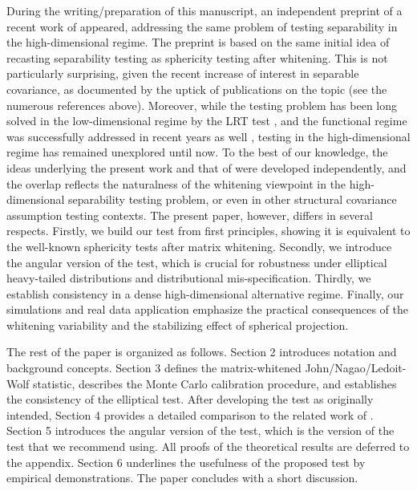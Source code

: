 \documentclass[12pt]{article}
\begin{document}
During the writing/preparation of this manuscript, an independent preprint of a recent work of \citet{sung2026testing} appeared, addressing the same problem of testing separability in the high-dimensional regime. The preprint is based on the same initial idea of recasting separability testing as sphericity testing after whitening. This is not particularly surprising, given the recent increase of interest in separable covariance, as documented by the uptick of publications on the topic (see the numerous references above). Moreover, while the testing problem has been long solved in the low-dimensional regime by the LRT test \citep{lu2005likelihood,MITCHELL2006}, and the functional regime was successfully addressed in recent years as well \citep{aston2017tests, dette2025testing}, testing in the high-dimensional regime has remained unexplored until now. To the best of our knowledge, the ideas underlying the present work and that of \citet{sung2026testing} were developed independently, and the overlap reflects the naturalness of the whitening viewpoint in the high-dimensional separability testing problem, or even in other structural covariance assumption testing contexts. The present paper, however, differs in several respects. Firstly, we build our test from first principles, showing it is equivalent to the well-known sphericity tests after matrix whitening. Secondly, we introduce the angular version of the test, which is crucial for robustness under elliptical heavy-tailed distributions and distributional mis-specification. Thirdly, we establish consistency in a dense high-dimensional alternative regime. Finally, our simulations and real data application emphasize the practical consequences of the whitening variability and the stabilizing effect of spherical projection.

The rest of the paper is organized as follows. Section 2 introduces notation and background concepts. Section 3 defines the matrix-whitened John/Nagao/Ledoit-Wolf statistic, describes the Monte Carlo calibration procedure, and establishes the consistency of the elliptical test. After developing the test as originally intended, Section 4 provides a detailed comparison to the related work of \citet{sung2026testing}. Section 5 introduces the angular version of the test, which is the version of the test that we recommend using. All proofs of the theoretical results are deferred to the appendix. Section 6 underlines the usefulness of the proposed test by empirical demonstrations. The paper concludes with a short discussion.
\end{document}

